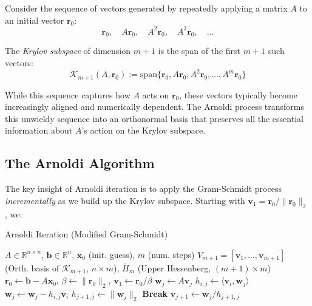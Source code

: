 
Consider the sequence of vectors generated by repeatedly applying a matrix $A$ to an initial vector $\mathbf{r}_0$:
\[
  \mathbf{r}_0, \quad A\mathbf{r}_0, \quad A^2\mathbf{r}_0, \quad A^3\mathbf{r}_0, \quad \ldots
\]

The \emph{Krylov subspace} of dimension $m+1$ is the span of the first $m+1$ such vectors:
\[
  \mathcal{K}_{m+1}(A,\mathbf{r}_0) := \text{span}\{\mathbf{r}_0, A\mathbf{r}_0, A^2\mathbf{r}_0, \ldots, A^m\mathbf{r}_0\}
\]

While this sequence captures how $A$ acts on $\mathbf{r}_0$, these vectors typically become increasingly aligned and numerically dependent. The Arnoldi process transforms this unwieldy sequence into an orthonormal basis that preserves all the essential information about $A$'s action on the Krylov subspace.


\subsection{The Arnoldi Algorithm}
The key insight of Arnoldi iteration is to apply the Gram-Schmidt process \emph{incrementally} as we build up the Krylov subspace. Starting with $\mathbf{v}_1 = \mathbf{r}_0/\|\mathbf{r}_0\|_2$, we:


\begin{algorithm}[htbp]
  \caption{Arnoldi Iteration (Modified Gram-Schmidt)}
  \label{alg:arnoldi}
  \begin{algorithmic}
    \Require $A\in\mathbb{R}^{n\times n}$, $\mathbf{b}\in\mathbb{R}^n$, $\mathbf{x}_0$ (init. guess), $m$ (num. steps)
    \Ensure  $V_{m+1} = [\mathbf{v}_1, \ldots, \mathbf{v}_{m+1}]$ (Orth. basis of $\mathcal{K}_{m+1}$, $n\times m$), $\overline{H}_m$ (Upper Hessenberg, $(m+1)\times m$)
    \State $\mathbf{r}_0 \gets \mathbf{b} - A\mathbf{x}_0$, $\beta \gets \|\mathbf{r}_0\|_2$, $\mathbf{v}_1 \gets \mathbf{r}_0/\beta$
    \State $\mathbf{w}_j \gets A\mathbf{v}_j$
    \State $h_{i,j} \gets \langle\mathbf{v}_i, \mathbf{w}_j\rangle$
    \State $\mathbf{w}_j \gets \mathbf{w}_j - h_{i,j}\mathbf{v}_i$
    \EndFor
    \State $h_{j+1,j} \gets \|\mathbf{w}_j\|_2$
    \State \textbf{Break}
    \EndIf
    \State $\mathbf{v}_{j+1} \gets \mathbf{w}_j/h_{j+1,j}$
    \EndFor
  \end{algorithmic}
\end{algorithm}

